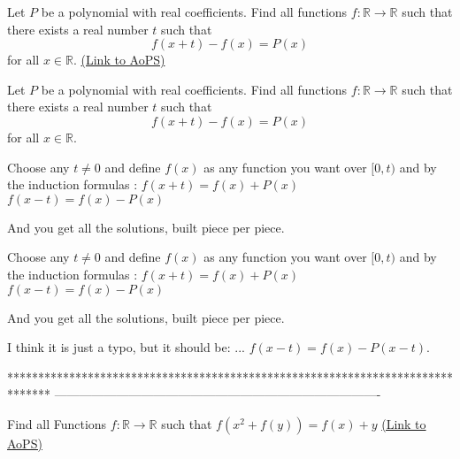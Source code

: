 \begin{problem}
	Let $P$ be a polynomial with real coefficients. Find all functions $f : \mathbb{R} \rightarrow \mathbb{R}$ such that there exists a real number $t$ such that
\[f(x+t) - f(x) = P(x)\]
for all $x \in \mathbb{R}$.
	\flushright \href{https://artofproblemsolving.com/community/c6h470219}{(Link to AoPS)}
\end{problem}



\begin{solution}
	\begin{tcolorbox}Let $P$ be a polynomial with real coefficients. Find all functions $f : \mathbb{R} \rightarrow \mathbb{R}$ such that there exists a real number $t$ such that
\[f(x+t) - f(x) = P(x)\]
for all $x \in \mathbb{R}$.\end{tcolorbox}
Choose any $t\ne 0$ and define $f(x)$ as any function you want over $[0,t)$ and by the induction formulas :
$f(x+t)=f(x)+P(x)$
$f(x-t)=f(x)-P(x)$

And you get all the solutions, built piece per piece.
\end{solution}



\begin{solution}
	\begin{tcolorbox}
Choose any $t\ne 0$ and define $f(x)$ as any function you want over $[0,t)$ and by the induction formulas :
$f(x+t)=f(x)+P(x)$
$f(x-t)=f(x)-P(x)$

And you get all the solutions, built piece per piece.\end{tcolorbox}
I think it is just a typo, but it should be:
...
$f(x-t)=f(x)-P(x-t)$.
\end{solution}
*******************************************************************************
-------------------------------------------------------------------------------

\begin{problem}
	Find all Functions $ f:\mathbb{R}\rightarrow\mathbb{R} $ such that 
$f(x^2+f(y))=f(x)+y$
	\flushright \href{https://artofproblemsolving.com/community/c6h470560}{(Link to AoPS)}
\end{problem}



